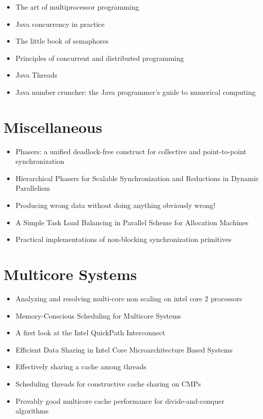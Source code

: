\begin{itemize}
\item The art of multiprocessor programming \cite{Herlihy2008}
\item Java concurrency in practice \cite{Goetz2006}
\item The little book of semaphores \cite{Downey2008}
\item Principles of concurrent and distributed programming
  \cite{Ben-Ari2006}
\item Java Threads \cite{Oaks2004}
\item Java number cruncher: the Java programmer's guide to numerical
  computing \cite{Mak2002}
\end{itemize}


\section{Miscellaneous}
\label{sec:lr-miscellaneous}

\begin{itemize}
\item Phasers: a unified deadlock-free construct for collective and
  point-to-point synchronization \cite{Shirako2008}
\item Hierarchical Phasers for Scalable Synchronization and Reductions
  in Dynamic Parallelism \cite{Shirako2010}
\item Producing wrong data without doing anything obviously wrong!
  \cite{Mytkowicz2009}
\item A Simple Task Load Balancing in Parallel Scheme for Allocation
  Machines \cite{Rudolph1991}
\item Practical implementations of non-blocking synchronization
  primitives \cite{Moir1997}
\end{itemize}


\section{Multicore Systems}
\label{sec:lr-multicore-systems}

\begin{itemize}
\item Analyzing and resolving multi-core non scaling on intel core 2
  processors \cite{Levinthal2007}
\item Memory-Conscious Scheduling for Multicore Systems \cite{Majo2010}
\item A first look at the Intel QuickPath Interconnect
  \cite{Maddox2009}
\item Efficient Data Sharing in Intel
  \textsuperscript{\textregistered} Core Microarchitecture Based
  Systems \cite{Shemer2007}
\item Effectively sharing a cache among threads \cite{Blelloch2004}
\item Scheduling threads for constructive cache sharing on CMPs
  \cite{Chen2007}
\item Provably good multicore cache performance for divide-and-conquer
  algorithms \cite{Blelloch2008}
\end{itemize}



